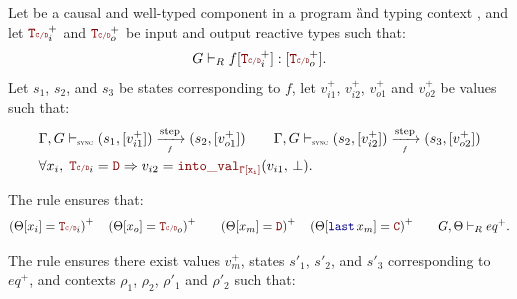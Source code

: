 \begin{skippableproof}
    Let  be a causal and well-typed component in a
    program \G and typing context \tyCtx, and let $\rType_i^+$ and $\rType_o^+$ be input and
    output reactive types such that:
    \begin{equation*}
        \compTypedReact{f}{\rType_i^+}{\rType_o^+}.
    \end{equation*}
    Let $s_1$, $s_2$, and $s_3$ be states corresponding to $f$, let $v_{i1}^+$, $v_{i2}^+$,
    $v_{o1}^+$ and $v_{o2}^+$ be values such that:
    \begin{align*}
         & \compOpsem{s_1}{v_{i1}^+}{f}{s_2}{v_{o1}^+} \qquad \compOpsem{s_2}{v_{i2}^+}{f}{s_3}{v_{o2}^+} \\
         & \forall x_i, \; \rType_i = \dType \Rightarrow v_{i2} = \intoVal{\tyCtx[x_i]}{v_{i1}}{\bot}.
    \end{align*}

    The rule  ensures that:
    \begin{align*}
        \left(\Theta[x_i] = \rType_i\right)^+       &  &  &
        \left(\Theta[x_o] = \rType_o\right)^+       &  &  &
        \left(\Theta[x_m] = \dType \right)^+        &  &  &
        \left(\Theta[\last{x_m}] = \cType \right)^+ &  &  &
        \eqTypedReact{\Theta}{eq^+}.
    \end{align*}

    The rule  ensures there exist values $v_m^+$,
    states $s'_1$, $s'_2$, and $s'_3$ corresponding to $eq^+$, and contexts $\rho_1$, $\rho_2$,
    $\rho'_1$ and $\rho'_2$ such that:
    \begin{center}
    \end{center}


\end{skippableproof}

